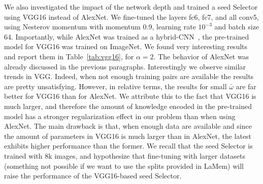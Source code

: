 \documentclass{sig-alternate-05-2015}
\begin{document}
We also investigated the impact of the network depth and trained a seed Selector using VGG16 instead of AlexNet. 
We fine-tuned the layers fc6, fc7, and all conv5, using Nesterov momentum with momentum 0.9, learning rate $10^{-3}$ and batch size 64.
Importantly, while AlexNet was trained as a hybrid-CNN~\cite{khosla2015understanding}, the pre-trained model for VGG16 was trained on ImageNet. We found very interesting results and report them in Table~\ref{tab:vgg16}, for $\alpha=2$. The behavior of AlexNet was already discussed in the previous paragraphs. Interestingly we observe similar trends in VGG. Indeed, when not enough training pairs are available the results are pretty unsatisfying. However, in relative terms, the results for small $\bar{\omega}$ are far better for VGG16 than for AlexNet. We attribute this to the fact that VGG16 is much larger, and therefore the amount of knowledge encoded in the pre-trained model has a stronger regularization effect in our problem than when using AlexNet. The main drawback is that, when enough data are available and since the amount of parameters in VGG16 is much larger than in AlexNet, the latest exhibits higher performance than the former. We recall that the seed Selector is trained with 8k images, and hypothesize that fine-tuning with larger datasets (something not possible if we want to use the splits provided in LaMem) will raise the performance of the VGG16-based seed Selector.

\end{document}
